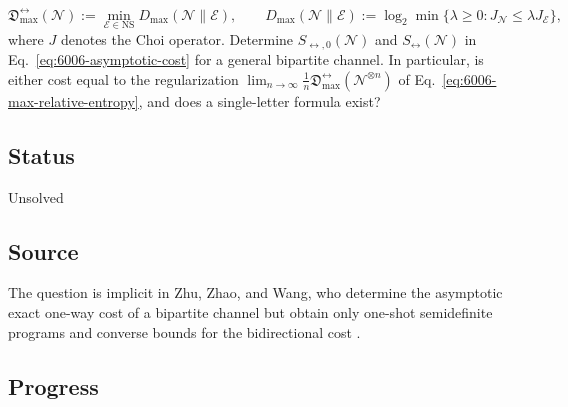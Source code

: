 \begin{equation}
  \mathfrak D^{\leftrightarrow}_{\max}(\mathcal N)
  :=\min_{\mathcal E\in\mathrm{NS}}D_{\max}(\mathcal N\|\mathcal E),
  \qquad
  D_{\max}(\mathcal N\|\mathcal E)
  :=\log_2\min\{\lambda\geq0:J_{\mathcal N}\leq\lambda J_{\mathcal E}\},
  \label{eq:6006-max-relative-entropy}
\end{equation}
where $J$ denotes the Choi operator.  Determine
$S_{\leftrightarrow,0}(\mathcal N)$ and $S_{\leftrightarrow}(\mathcal N)$
in Eq.~\eqref{eq:6006-asymptotic-cost} for a general bipartite channel.
In particular, is either cost equal to the regularization
$\lim_{n\to\infty}\frac1n
\mathfrak D^{\leftrightarrow}_{\max}(\mathcal N^{\otimes n})$ of
Eq.~\eqref{eq:6006-max-relative-entropy}, and does a single-letter formula
exist?

\subsection*{Status}

Unsolved

\subsection*{Source}

The question is implicit in Zhu, Zhao, and Wang, who determine the
asymptotic exact one-way cost of a bipartite channel but obtain only
one-shot semidefinite programs and converse bounds for the bidirectional
cost .

\subsection*{Progress}

